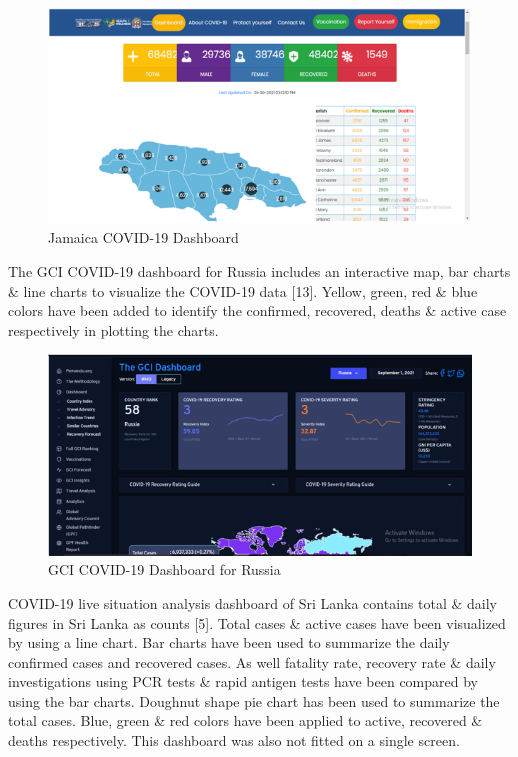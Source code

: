 \documentclass[
]{article}
\begin{document}
\begin{figure}
\includegraphics[width=8.35in]{Images/11} \caption{Jamaica COVID-19 Dashboard}\label{fig:unnamed-chunk-11}
\end{figure}

The GCI COVID-19 dashboard for Russia includes an interactive map, bar
charts \& line charts to visualize the COVID-19 data {[}13{]}. Yellow,
green, red \& blue colors have been added to identify the confirmed,
recovered, deaths \& active case respectively in plotting the charts.

\begin{figure}
\includegraphics[width=8.25in]{Images/12} \caption{GCI COVID-19 Dashboard for Russia}\label{fig:unnamed-chunk-12}
\end{figure}

COVID-19 live situation analysis dashboard of Sri Lanka contains total
\& daily figures in Sri Lanka as counts {[}5{]}. Total cases \& active
cases have been visualized by using a line chart. Bar charts have been
used to summarize the daily confirmed cases and recovered cases. As well
fatality rate, recovery rate \& daily investigations using PCR tests \&
rapid antigen tests have been compared by using the bar charts. Doughnut
shape pie chart has been used to summarize the total cases. Blue, green
\& red colors have been applied to active, recovered \& deaths
respectively. This dashboard was also not fitted on a single screen.
\end{document}
